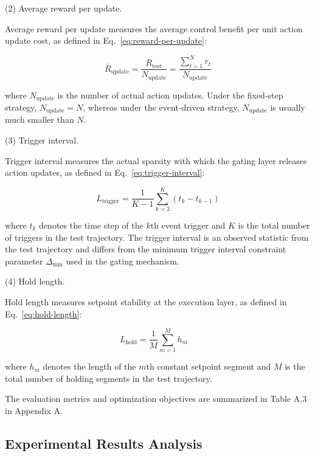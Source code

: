 ﻿\documentclass[preprint,12pt,number]{elsarticle}
\begin{document}
\par\smallskip
\noindent (2) Average reward per update.
\par\nobreak\noindent Average reward per update measures the average control benefit per unit action update cost, as defined in Eq.~\eqref{eq:reward-per-update}:

\[
\bar{R}_{\text{update}} = \frac{R_{\text{test}}}{N_{\text{update}}} = \frac{\sum_{t=1}^{N} r_t}{N_{\text{update}}} \tag{35}\label{eq:reward-per-update}
\]

\noindent where \(N_{\text{update}}\) is the number of actual action updates. Under the fixed-step strategy, \(N_{\text{update}} = N\), whereas under the event-driven strategy, \(N_{\text{update}}\) is usually much smaller than \(N\).

\par\smallskip
\noindent (3) Trigger interval.
\par\nobreak\noindent Trigger interval measures the actual sparsity with which the gating layer releases action updates, as defined in Eq.~\eqref{eq:trigger-interval}:

\[
L_{\text{trigger}} = \frac{1}{K-1}\sum_{k=2}^{K}(t_k - t_{k-1}) \tag{36}\label{eq:trigger-interval}
\]

\noindent where \(t_k\) denotes the time step of the \(k\)th event trigger and \(K\) is the total number of triggers in the test trajectory. The trigger interval is an observed statistic from the test trajectory and differs from the minimum trigger interval constraint parameter \(\Delta_{\min}\) used in the gating mechanism.

\par\smallskip
\noindent (4) Hold length.
\par\nobreak\noindent Hold length measures setpoint stability at the execution layer, as defined in Eq.~\eqref{eq:hold-length}:

\[
L_{\text{hold}} = \frac{1}{M}\sum_{m=1}^{M}h_m \quad \tag{37}\label{eq:hold-length}
\]

\noindent where \(h_m\) denotes the length of the \(m\)th constant setpoint segment and \(M\) is the total number of holding segments in the test trajectory.

The evaluation metrics and optimization objectives are summarized in Table A.3 in Appendix A.

\subsection{Experimental Results Analysis}\label{experimental-results-analysis}
\end{document}
